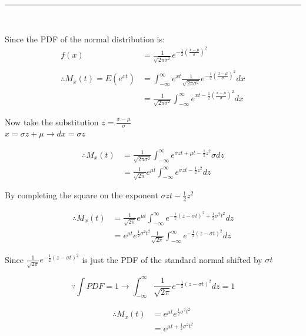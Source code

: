\documentclass[12pt]{article}
\newcommand{\infint}[2]{\int_{-\infty}^{\infty} #1 d#2}
\begin{document}
\vspace{1em}
\hrule\
\begin{center}
Since the PDF of the normal distribution is: 
\begin{align*}
f(x) &= \frac{1}{\sqrt{2\pi\sigma^2}} e^{-\frac{1}{2} \left(\frac{x-\mu}{\sigma}\right)^2} \\ \\ %
\therefore M_x(t) = E(e^{xt}) &= \infint{e^{xt} \frac{1}{\sqrt{2\pi\sigma^2}} e^{-\frac{1}{2} \left(\frac{x-\mu}{\sigma}\right)^2}}{x}\\ %
							  &= \frac{1}{\sqrt{2\pi\sigma^2}}	\infint{e^{xt - \frac{1}{2}\left(\frac{x-\mu}{\sigma}\right)^2}}{x} %
\end{align*}

\vspace{2em}
Now take the substitution \(z = \frac{x-\mu}{\sigma}\) \\
\(x = \sigma z + \mu \longrightarrow dx = \sigma z \)

\begin{align*}
	\therefore M_x(t) &= \frac{1}{\sqrt{2\pi\sigma^2}}	\infint{e^{\sigma zt + \mu t - \frac{1}{2}z^2} \sigma}{z} \\ %
					  &= \frac{1}{\sqrt{2\pi}}e^{\mu t}	\infint{e^{\sigma zt - \frac{1}{2}z^2} }{z} %
\end{align*}

\vspace{2em}
By completing the square on the exponent \( \sigma zt - \frac{1}{2}z^2 \)

\begin{align*}
	\therefore M_x(t) &= \frac{1}{\sqrt{2\pi}}e^{\mu t}	\infint{e^{-\frac{1}{2}\left(z-\sigma t \right)^2 + \frac{1}{2}\sigma^2 t^2} }{z} \\  %
					  &= e^{\mu t} e^{\frac{1}{2}\sigma^2 t^2}	\frac{1}{\sqrt{2\pi}} \infint{e^{-\frac{1}{2}\left(z-\sigma t \right)^2}}{z} %
\end{align*}

\newpage
Since \( \frac{1}{\sqrt{2\pi}} e^{-\frac{1}{2}\left(z-\sigma t \right)^2} \) is just the PDF of the standard normal shifted by \(\sigma t\)

\[
	\because \int PDF = 1  \longrightarrow  \infint {\frac{1}{\sqrt{2\pi}} e^{-\frac{1}{2}\left(z-\sigma t \right)^2}}{z} = 1
\]

\begin{align*}
	\therefore M_x(t) &= e^{\mu t} e^{\frac{1}{2}\sigma^2 t^2}	\\
					  &= e^{\mu t +\frac{1}{2}\sigma^2 t^2}
\end{align*}


\end{center}
\end{document}
